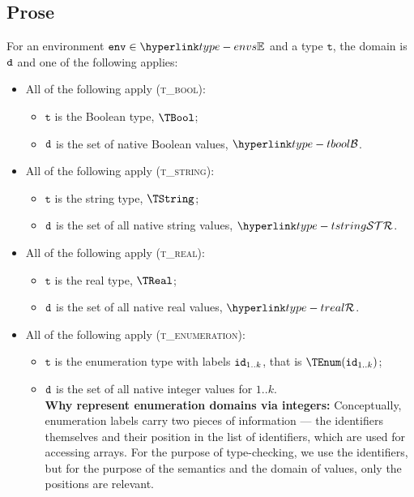 \documentclass{book}
\newcommand\env[0]{\texttt{env}}
\newcommand\vt[0]{\texttt{t}}
\begin{document}
\subsection{Prose}
For an environment $\env \in \envs$ and a type $\vt$, the domain is $\texttt{d}$ and one of the following applies:
\begin{itemize}
  \item All of the following apply (\textsc{t\_bool}):
  \begin{itemize}
    \item $\vt$ is the Boolean type, $\TBool$;
    \item $\texttt{d}$ is the set of native Boolean values, $\tbool$.
  \end{itemize}

  \item All of the following apply (\textsc{t\_string}):
  \begin{itemize}
    \item $\vt$ is the string type, $\TString$;
    \item $\texttt{d}$ is the set of all native string values, $\tstring$.
  \end{itemize}

  \item All of the following apply (\textsc{t\_real}):
  \begin{itemize}
    \item $\vt$ is the real type, $\TReal$;
    \item $\texttt{d}$ is the set of all native real values, $\treal$.
  \end{itemize}

  \item All of the following apply (\textsc{t\_enumeration}):
  \begin{itemize}
    \item $\vt$ is the enumeration type with labels $\texttt{id}_{1..k}$, that is $\TEnum(\id_{1..k})$;
    \item $\texttt{d}$ is the set of all native integer values for $1..k$.\\
    \textbf{Why represent enumeration domains via integers:}
    Conceptually, enumeration labels carry two pieces of information --- the identifiers themselves
    and their position in the list of identifiers, which are used for accessing arrays.
    For the purpose of type-checking, we use the identifiers, but for the purpose of the semantics
    and the domain of values, only the positions are relevant.
  \end{itemize}


\end{itemize}
\end{document}
